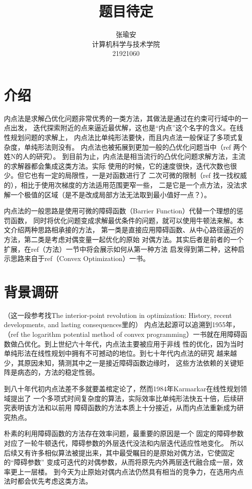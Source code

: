 \documentclass{article}
\title{题目待定}
\author{张瑜安\\ 计算机科学与技术学院 \\21921060}
\date{}
\begin{document}
\maketitle
\section{介绍}
内点法是求解凸优化问题非常优秀的一类方法，其做法是通过在约束可行域中的一点出发，
迭代探索附近的点来逼近最优解，这也是“内点”这个名字的含义。在线性规划问题的求解上，
内点法比单纯形法要快，而且内点法一般保证了多项式复杂度，单纯形法则没有。
内点法也被拓展到更加一般的凸优化问题当中（ref 两个姓N的人的研究）。
到目前为止，内点法是相当流行的凸优化问题求解方法，主流的求解器都会集成这类方法。实际
使用的时候，它的速度很快，迭代次数也很少。但它也有一定的局限性，一是对函数进行了
二次可微的限制（ref 找一找权威的），相比于使用次梯度的方法适用范围更窄一些，
二是它是一个点方法，没法求解一个极值的区域（是不是改成局部方法无法取到最小值好一点？）。

内点法的一般思路是使用可微的障碍函数（Barrier Function）代替一个理想的惩罚函数，
同时将优化问题变成求解最优条件的问题，就可以使用牛顿法来解。本文介绍两种思路相承接的方法，
第一类是直接应用障碍函数、从中心路径逼近的方法，第二类是考虑对偶变量一起优化的原始
对偶方法。其实后者是前者的一个扩展，在ref（方法）一节中将会展示如何从第一种方法
启发得到第二种，这种启示思路来自于ref（Convex Optimization）一书。


\section{背景调研}
（这一段参考找The interior-point revolution in optimization: History, recent developments, and lasting consequences里的）
内点法起源可以追溯到1955年，（ref the logarithm potential method of convex 
programming）一书就在用障碍函数做凸优化。到上世纪六十年代，内点法主要被应用于非线
性的优化，因为当时单纯形法在线性规划中拥有不可撼动的地位。到七十年代内点法的研究
越来越少，其原因未知，猜测其中之一是接近障碍函数边缘时，
这些方法依赖的关键矩阵是病态的，方法的稳定性弱。

到八十年代初内点法差不多就要盖棺定论了，然而1984年Karmarkar在线性规划领域提出了
一个多项式时间复杂度的算法，实际效率比单纯形法快五十倍，后续研究表明该方法和以前用
障碍函数的方法本质上十分接近，从而内点法重新成为研究热点。

朴素的利用障碍函数的方法存在效率问题，最重要的原因是一个
固定的障碍参数对应了一轮牛顿迭代，障碍参数的外层迭代没法和内层迭代适应性地变化。
所以后续又有许多相似算法被提出来，其中最受瞩目的是原始对偶方法，它使固定的“障碍参数”
变成可迭代的对偶参数，从而将原先内外两层迭代融合成一层，效率更上一层楼。
到今天为止原始对偶内点法仍然具有相当的竞争力，在选用内点法时都会优先考虑这类方法。
\end{document}
